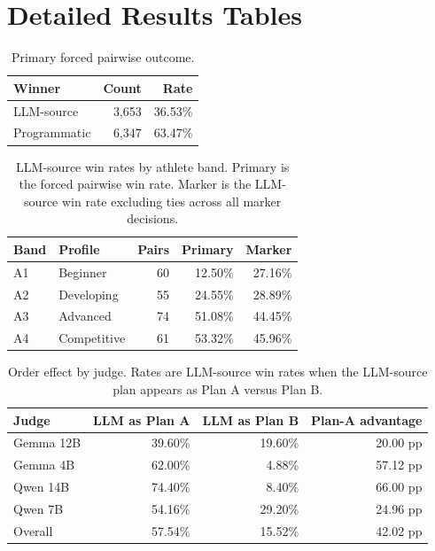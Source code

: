 \documentclass[11pt]{article}
\begin{document}
\clearpage



\clearpage
\onecolumn
\appendix



\section{Detailed Results Tables}
\label{app:detailed-tables}

\begin{table}[h]
\centering
\small
\begin{tabular}{lrr}
\toprule
Winner & Count & Rate \\
\midrule
LLM-source & 3,653 & 36.53\% \\
Programmatic & 6,347 & 63.47\% \\
\bottomrule
\end{tabular}
\caption{Primary forced pairwise outcome.}
\label{tab:primary-app}
\end{table}

\begin{table}[h]
\centering
\small
\begin{tabular}{llrrr}
\toprule
Band & Profile & Pairs & Primary & Marker \\
\midrule
A1 & Beginner & 60 & 12.50\% & 27.16\% \\
A2 & Developing & 55 & 24.55\% & 28.89\% \\
A3 & Advanced & 74 & 51.08\% & 44.45\% \\
A4 & Competitive & 61 & 53.32\% & 45.96\% \\
\bottomrule
\end{tabular}
\caption{LLM-source win rates by athlete band. Primary is the forced pairwise win rate. Marker is the LLM-source win rate excluding ties across all marker decisions.}
\label{tab:athlete-app}
\end{table}

\begin{table}[h]
\centering
\small
\begin{tabular}{lrrr}
\toprule
Judge & LLM as Plan A & LLM as Plan B & Plan-A advantage \\
\midrule
Gemma 12B & 39.60\% & 19.60\% & 20.00 pp \\
Gemma 4B & 62.00\% & 4.88\% & 57.12 pp \\
Qwen 14B & 74.40\% & 8.40\% & 66.00 pp \\
Qwen 7B & 54.16\% & 29.20\% & 24.96 pp \\
Overall & 57.54\% & 15.52\% & 42.02 pp \\
\bottomrule
\end{tabular}
\caption{Order effect by judge. Rates are LLM-source win rates when the LLM-source plan appears as Plan A versus Plan B.}
\label{tab:order-effect-app}
\end{table}
\end{document}
